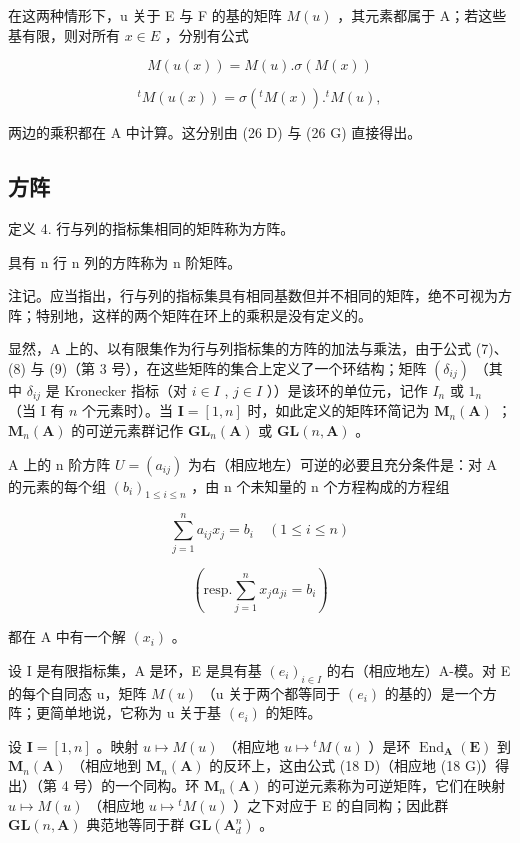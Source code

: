 在这两种情形下，u 关于 E 与 F 的基的矩阵 \(M(u)\) ，其元素都属于 A；若这些基有限，则对所有 \(x \in E\) ，分别有公式

\[
M (u (x)) = M (u). \sigma (M (x))\tag{17 GD}
\]

\[
{ } ^ { t } M ( u ( x ) ) = \sigma ( { } ^ { t } M ( x ) ) . { } ^ { t } M ( u ) ,\tag{17 DG}
\]

两边的乘积都在 A 中计算。这分别由 (26 D) 与 (26 G) 直接得出。

\subsection{方阵}

定义 4. 行与列的指标集相同的矩阵称为方阵。

具有 n 行 n 列的方阵称为 n 阶矩阵。

注记。应当指出，行与列的指标集具有相同基数但并不相同的矩阵，绝不可视为方阵；特别地，这样的两个矩阵在环上的乘积是没有定义的。

显然，A 上的、以有限集作为行与列指标集的方阵的加法与乘法，由于公式 (7)、(8) 与 (9)（第 3 号），在这些矩阵的集合上定义了一个环结构；矩阵 \((\delta_{ij})\) （其中 \(\delta_{ij}\) 是 Kronecker 指标（对 \(i \in I\) , \(j \in I\) ））是该环的单位元，记作 \(I_n\) 或 \(1_n\) （当 I 有 \(n\) 个元素时）。当 \(\mathbf{I} = [1, n]\) 时，如此定义的矩阵环简记为 \(\mathbf{M}_n(\mathbf{A})\) ； \(\mathbf{M}_n(\mathbf{A})\) 的可逆元素群记作 \(\mathbf{GL}_n(\mathbf{A})\) 或 \(\mathbf{GL}(n, \mathbf{A})\) 。

A 上的 n 阶方阵 \(U = (a_{ij})\) 为右（相应地左）可逆的必要且充分条件是：对 A 的元素的每个组 \((b_i)_{1 \leq i \leq n}\) ，由 n 个未知量的 n 个方程构成的方程组

\[
\sum_ {j = 1} ^ {n} a _ {i j} x _ {j} = b _ {i} \quad (1 \leqslant i \leqslant n)
\]

\[
\left(\text {resp.} \sum_ {j = 1} ^ {n} x _ {j} a _ {j i} = b _ {i}\right)
\]

都在 A 中有一个解 \((x_{i})\) 。

设 I 是有限指标集，A 是环，E 是具有基 \((e_{i})_{i\in I}\) 的右（相应地左）A-模。对 E 的每个自同态 u，矩阵 \(M(u)\) （u 关于两个都等同于 \((e_{i})\) 的基的）是一个方阵；更简单地说，它称为 u 关于基 \((e_{i})\) 的矩阵。

设 \(\mathbf{I} = [1, n]\) 。映射 \(u \mapsto M(u)\) （相应地 \(u \mapsto {}^t M(u)\) ）是环 \(\operatorname{End}_{\mathbf{A}}(\mathbf{E})\) 到 \(\mathbf{M}_n(\mathbf{A})\) （相应地到 \(\mathbf{M}_n(\mathbf{A})\) 的反环上，这由公式 (18 D)（相应地 (18 G)）得出）（第 4 号）的一个同构。环 \(\mathbf{M}_{n}(\mathbf{A})\) 的可逆元素称为可逆矩阵，它们在映射 \(u \mapsto M(u)\) （相应地 \(u \mapsto {}^{t}M(u)\) ）之下对应于 E 的自同构；因此群 \(\mathbf{GL}(n, \mathbf{A})\) 典范地等同于群 \(\mathbf{GL}(\mathbf{A}_{d}^{n})\) 。

